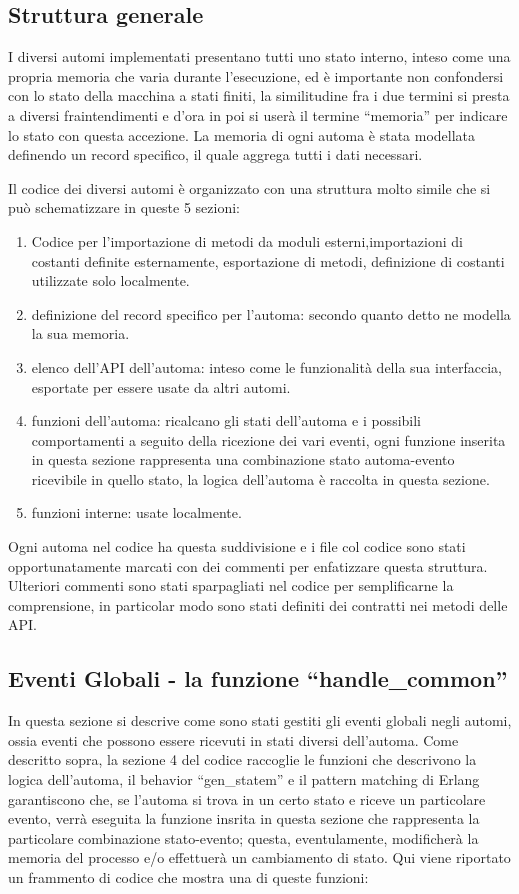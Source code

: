 \subsection{Struttura generale} \label{strutturaGeneraleAutomi}
I diversi automi implementati presentano tutti uno stato interno, inteso come una propria memoria che varia durante l'esecuzione, ed è importante non confondersi con lo stato della macchina a stati finiti, la similitudine fra i due termini si presta a diversi fraintendimenti e d'ora in poi si userà il termine ``memoria'' per indicare lo stato con questa accezione. La memoria di ogni automa è stata modellata definendo un record specifico, il quale aggrega tutti i dati necessari.

Il codice dei diversi automi è organizzato con una struttura molto simile che si può schematizzare in queste 5 sezioni:

\begin{enumerate}
	\item Codice per l'importazione di metodi da moduli esterni,importazioni di costanti definite esternamente, esportazione di metodi, definizione di costanti utilizzate solo localmente.
	\item definizione del record specifico per l'automa: secondo quanto detto ne modella la sua memoria.
	\item elenco dell'API dell'automa: inteso come le funzionalità della sua interfaccia, esportate per essere usate da altri automi.
	\item funzioni dell'automa: ricalcano gli stati dell'automa e i possibili comportamenti a seguito della ricezione dei vari eventi, ogni funzione inserita in questa sezione rappresenta una combinazione stato automa-evento ricevibile in quello stato, la logica dell'automa è raccolta in questa sezione.
	\item funzioni interne: usate localmente.
\end{enumerate}

Ogni automa nel codice ha questa suddivisione e i file col codice sono stati opportunatamente marcati con dei commenti per enfatizzare questa struttura. Ulteriori commenti sono stati sparpagliati nel codice per semplificarne la comprensione, in particolar modo sono stati definiti dei contratti nei metodi delle API.

\subsection{Eventi Globali - la funzione ``handle\_common''} \label{eventiGlobaliAutomi}
In questa sezione si descrive come sono stati gestiti gli eventi globali negli automi, ossia eventi che possono essere ricevuti in stati diversi dell'automa. Come descritto sopra, la sezione 4 del codice raccoglie le funzioni che descrivono la logica dell'automa, il behavior ``gen\_statem'' e il pattern matching di Erlang garantiscono che, se l'automa si trova in un certo stato e riceve un particolare evento, verrà eseguita la funzione insrita in questa sezione che rappresenta la particolare combinazione stato-evento; questa, eventulamente, modificherà la memoria del processo e/o  effettuerà un cambiamento di stato. 
Qui viene riportato un frammento di codice che mostra una di queste funzioni: 

